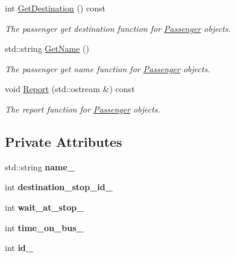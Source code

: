 \begin{figure}[H]
\begin{center}
\begin{DoxyCompactItemize}
int \hyperlink{classPassenger_a49db0ee527377aae6077df190a11501c}{Get\+Destination} () const
\begin{DoxyCompactList}\small\item\em The passenger get destination function for \hyperlink{classPassenger}{Passenger} objects. \end{DoxyCompactList}\item 
std\+::string \hyperlink{classPassenger_ad186ef0e9d198895eaa2b14c66869e2b}{Get\+Name} ()
\begin{DoxyCompactList}\small\item\em The passenger get name function for \hyperlink{classPassenger}{Passenger} objects. \end{DoxyCompactList}\item 
void \hyperlink{classPassenger_aee3f9d7f6f2a848034971559faf65248}{Report} (std\+::ostream \&) const
\begin{DoxyCompactList}\small\item\em The report function for \hyperlink{classPassenger}{Passenger} objects. \end{DoxyCompactList}\end{DoxyCompactItemize}
\subsection*{Private Attributes}
\begin{DoxyCompactItemize}
\item 
\mbox{\label{classPassenger_a97a4a76f73532809a8c92fcccd126441}} 
std\+::string {\bfseries name\+\_\+}
\item 
\mbox{\label{classPassenger_a88f749669b2e642554c191f90a3ad3ff}} 
int {\bfseries destination\+\_\+stop\+\_\+id\+\_\+}
\item 
\mbox{\label{classPassenger_a91bdd12e81993d7b9987a4a58d5d4f13}} 
int {\bfseries wait\+\_\+at\+\_\+stop\+\_\+}
\item 
\mbox{\label{classPassenger_a2fb16451ba99fd11739fa61a2a9e034f}} 
int {\bfseries time\+\_\+on\+\_\+bus\+\_\+}
\item 
\mbox{\label{classPassenger_a99fb191c2b50c78501160ee675099be0}} 
int {\bfseries id\+\_\+}
\end{DoxyCompactItemize}

\end{center}
\end{figure}

